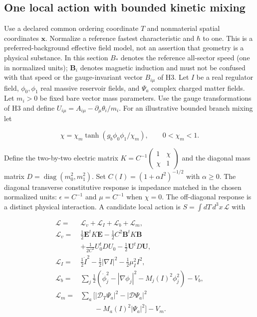 \documentclass[
  11pt,
  twoside]{article}
\begin{document}
\subsection{One local action with bounded kinetic
mixing}\label{one-local-action-with-bounded-kinetic-mixing}

Use a declared common ordering coordinate \(T\) and nonmaterial spatial
coordinates \(\mathbf{x}\). Normalize a reference fastest characteristic
and \(\hbar\) to one. This is a preferred-background effective field
model, not an assertion that geometry is a physical substance. In this
section \(B_*\) denotes the reference all-sector speed (one in
normalized units); \(\mathbf{B}_i\) denotes magnetic induction and must
not be confused with that speed or the gauge-invariant vector
\(B_{i\mu}\) of H3. Let \(I\) be a real regulator field,
\(\phi_0,\phi_1\) real massive reservoir fields, and \(\Psi_a\) complex
charged matter fields. Let \(m_i>0\) be fixed bare vector mass
parameters. Use the gauge transformations of H3 and define
\(U_{i\mu}=A_{i\mu}-\partial_\mu\theta_i/m_i\). For an illustrative
bounded branch mixing let

\[\chi=\chi_m\tanh(g_b\phi_0\phi_1/\chi_m),\qquad 0<\chi_m<1.\tag{J1}\]

Define the two-by-two electric matrix
\(K=C^{-1}\left(\begin{smallmatrix}1&\chi\\\chi&1\end{smallmatrix}\right)\)
and the diagonal mass matrix \(D=\operatorname{diag}(m_0^2,m_1^2)\). Set
\(C(I)=(1+\alpha I^2)^{-1/2}\) with \(\alpha\geq0\). The diagonal
transverse constitutive response is impedance matched in the chosen
normalized units: \(\epsilon=C^{-1}\) and \(\mu=C^{-1}\) when
\(\chi=0\). The off-diagonal response is a distinct physical
interaction. A candidate local action is \(S=\int dT\,d^3x\,\mathcal L\)
with

\[\begin{aligned}
\mathcal L={}&\mathcal L_v+\mathcal L_I+\mathcal L_b+\mathcal L_m,\\
\mathcal L_v={}&\tfrac12\mathbf E^t K\mathbf E
-\tfrac12 C^2\mathbf B^t K\mathbf B\\
&+\tfrac1{2C^2}U_0^tDU_0-\tfrac12\mathbf U^tD\mathbf U,\\
\mathcal L_I={}&\tfrac12\dot I^2-\tfrac12|\nabla I|^2-\tfrac12\mu_I^2I^2,\\
\mathcal L_b={}&\sum_j\tfrac12(\dot\phi_j^2-|\nabla\phi_j|^2
-M_j(I)^2\phi_j^2)-V_b,\\
\mathcal L_m={}&\sum_a\big[|\mathcal D_T\Psi_a|^2
-|\boldsymbol{\mathcal D}\Psi_a|^2\\
&\hspace{2em}-M_a(I)^2|\Psi_a|^2\big]-V_m.
\end{aligned}\tag{J2}\]
\end{document}
